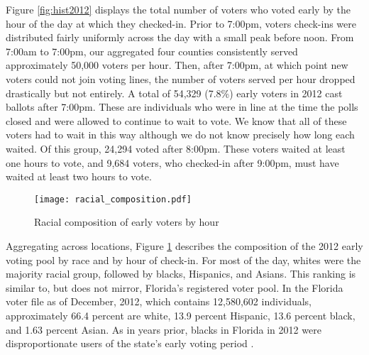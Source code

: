 \documentclass[12pt,titlepage]{article}
\begin{document}
Figure \ref{fig:hist2012} displays the total number of voters who
voted early by the hour of the day at which they checked-in. Prior to
7:00pm, voters check-ins were distributed fairly uniformly across the
day with a small peak before noon.  From 7:00am to 7:00pm, our
aggregated four counties consistently served approximately 50,000
voters per hour. Then, after 7:00pm, at which point new voters could
not join voting lines, the number of voters served per hour dropped
drastically but not entirely.  A total of 54,329 (7.8\%) early voters
in 2012 cast ballots after 7:00pm. These are individuals who were in
line at the time the polls closed and were allowed to continue to wait
to vote.  We know that all of these voters had to wait in this way
although we do not know precisely how long each waited.  Of this
group, 24,294 voted after 8:00pm.  These voters waited at least one
hours to vote, and 9,684 voters, who checked-in after 9:00pm, must
have waited at least two hours to vote.




\begin{figure}[!ht]
\caption{Racial composition of early voters by hour}
  \label{fig:race2012}
  \centering
    \centering\texttt{[image: racial\_composition.pdf]}
\end{figure}

Aggregating across locations, Figure \ref{fig:race2012} describes the
composition of the 2012 early voting pool by race and by hour of
check-in.  For most of the day, whites were the majority racial group,
followed by blacks, Hispanics, and Asians.  This ranking is similar
to, but does not mirror, Florida's registered voter pool.  In the
Florida voter file as of December, 2012, which contains 12,580,602
individuals, approximately 66.4 percent are white, 13.9 percent
Hispanic, 13.6 percent black, and 1.63 percent Asian.  As in years
prior, blacks in Florida in 2012 were disproportionate users of the
state's early voting period \citep{herronsmith:souls}.

\end{document}
